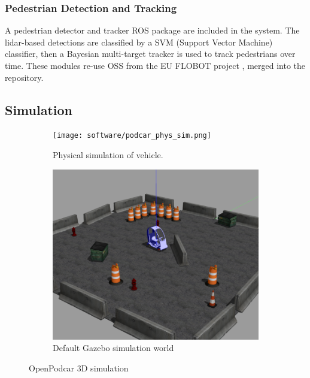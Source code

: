 \documentclass[a4paper]{article}
\begin{document}
	\subsubsection{Pedestrian Detection and Tracking}
	
	A pedestrian detector and tracker ROS package are included in the system.  The lidar-based detections are classified by a SVM (Support Vector Machine) classifier, then a Bayesian multi-target tracker is used to track pedestrians over time. These modules re-use OSS from the EU FLOBOT project \cite{yan2020robot}, merged into the repository.
	
	
	\subsection{Simulation}
	
	\begin{figure}
		\centering
		\begin{subfigure}{0.45\textwidth}
			\centering
			\texttt{[image: software/podcar\_phys\_sim.png]}
			\caption{Physical simulation of vehicle.}
			\label{fig:physSim}
		\end{subfigure}	
		\quad
		\begin{subfigure}{0.45\textwidth}
			\centering
			\includegraphics[width=0.9\columnwidth]{figs_sim/podcar_loaded_gazebo.png}
			\caption{Default Gazebo simulation world}
			\label{fig:sim_world}
		\end{subfigure}
		\caption{OpenPodcar 3D simulation}
	\end{figure}
	
\end{document}
